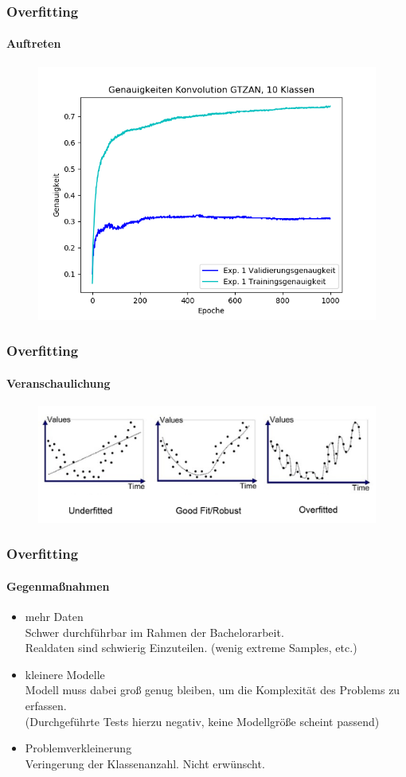 \documentclass{beamer}
\begin{document}


\frame
{
	\frametitle{Overfitting}
	\framesubtitle{Auftreten}
	\begin{figure}[h!]
		\centering
		\includegraphics[width=0.7\linewidth,height=0.7\textheight, keepaspectratio]{res/old/ex1.png}
	\end{figure}
}

\frame
{
	\frametitle{Overfitting}
	\framesubtitle{Veranschaulichung}
		\begin{figure}[h!]
		\centering
		\includegraphics[width=0.9\linewidth,height=0.9\textheight, keepaspectratio]{res/old/overfitting_expl.png}
	\footnotemark
	\end{figure}


}

\frame
{
	\frametitle{Overfitting}
	\framesubtitle{Gegenmaßnahmen}
	\begin{itemize}
		\item mehr Daten\\
			Schwer durchführbar im Rahmen der Bachelorarbeit.\\
			Realdaten sind schwierig Einzuteilen. (wenig extreme Samples, etc.)
		\item kleinere Modelle\\
	Modell muss dabei groß genug bleiben, um die Komplexität des Problems zu erfassen.\\
		(Durchgeführte Tests hierzu negativ, keine Modellgröße scheint passend)
		\item Problemverkleinerung\\
	Veringerung der Klassenanzahl. Nicht erwünscht.
	\end{itemize}
}
\end{document}
